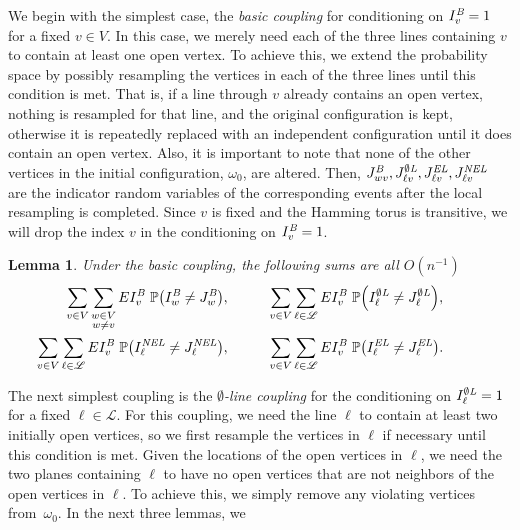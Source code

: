 \documentclass{amsart}
\newcommand{\vect}[1]{{ #1}}
\newcommand{\prob}{\mathbb{P}}
\newcommand{\B}{I^{\text{\em B}}}
\newcommand{\Lfoo}{I^{\text{\em L}}}
\newcommand{\OL}{I^{\emptyset\text{\em L}}}
\newcommand{\EL}{I^{\text{\em EL}}}
\newcommand{\NEL}{I^{\text{\em NEL}}}
\newcommand{\JB}{J^{\text{\em B}}}
\newcommand{\JL}{J^{\text{\em L}}}
\newcommand{\JOL}{J^{\emptyset\text{\em L}}}
\newcommand{\JEL}{J^{\text{\em EL}}}
\newcommand{\JNEL}{J^{\text{\em NEL}}}
\numberwithin{equation}{section}
\newcommand{\lineset}{\mathscr{L}}
\newcommand{\Ln}{\ell}
\newtheorem{lemma}[theorem]{Lemma}
\theoremstyle{definition}
\theoremstyle{remark}
\begin{document}
We begin with the simplest case, the {\em basic coupling} for conditioning on $\B_{\vect{v}} = 1$ for a fixed $\vect{v}\in V$.  In this case, we merely need each of the three lines containing $\vect{v}$ to contain at least one open vertex.  To achieve this, we extend the probability space by possibly resampling the vertices in each of the three lines until this condition is met.  That is, if a line through $\vect{v}$ already contains an open vertex, nothing is resampled for that line, and the original configuration is kept, otherwise it is repeatedly replaced with an independent configuration until it does contain an open vertex.  Also, it is important to note that none of the other vertices in the initial configuration, $\omega_0$, are altered.  Then, $\JB_{\vect{wv}}, \JOL_{\Ln\vect{v}}, \JEL_{\Ln\vect{v}}, \JNEL_{\Ln\vect{v}}$ are the indicator random variables of the corresponding events after the local resampling is completed.  Since $\vect{v}$ is fixed and the Hamming torus is transitive, we will drop the index $\vect{v}$ in the conditioning on $\B_{\vect{v}}=1$.  %
\begin{lemma}
\label{basic-coupling-lem}
Under the basic coupling, the following sums are all $O(n^{-1})$
\begin{align*}
\sum_{\vect{v}\in V} \sum_{\substack{\vect{w}\in V \\ \vect{w}\neq\vect{v}}} E\B_{\vect{v}}\ \prob{\left(\B_{\vect{w}} \neq \JB_{\vect{w}}\right)}, & \hspace{1cm} \sum_{\vect{v}\in V} \sum_{\Ln \in \lineset} E\B_{\vect{v}}\ \prob{\left(\OL_\Ln \neq \JOL_\Ln\right)},
\hspace{1cm}  \\
\sum_{\vect{v}\in V} \sum_{\Ln \in \lineset} E\B_{\vect{v}}\ \prob{\left(\NEL_\Ln \neq \JNEL_\Ln\right)}, &\hspace{1cm} \sum_{\vect{v}\in V} \sum_{\Ln \in \lineset} E\B_{\vect{v}}\ \prob{\left(\EL_\Ln \neq \JEL_\Ln\right)}.
\end{align*}
\end{lemma}
The next simplest coupling is the {\em $\emptyset$-line coupling} for the conditioning on $\OL_\Ln = 1$ for a fixed $\Ln \in \lineset$.  For this coupling, we need the line $\Ln$ to contain at least two initially open vertices, so we first resample the vertices in $\Ln$ if necessary until this condition is met.  Given the locations of the open vertices in $\Ln$, we need the two planes containing $\Ln$ to have no open vertices that are not neighbors of the open vertices in $\Ln$.  To achieve this, we simply remove any violating vertices from~$\omega_0$.  In the next three lemmas, we
\end{document}
